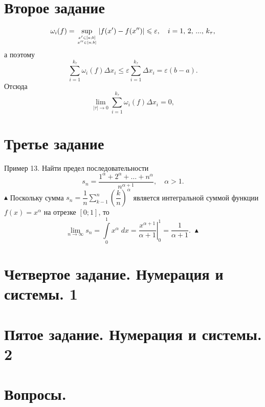 \documentclass[a4paper,12pt]{article} %
\begin{document}
	\section{Второе задание}
	$$
		\omega_i(f) = \sup \limits_{x' \in \left[a ; b\right] \atop x'' \in \left[a ; b\right]} |f(x') -f(x'')| \leqslant \varepsilon, \quad
		i=1,\, 2, \, ... , \, k_\tau,
	$$
	а поэтому
	$$
		\sum \limits_{i=1}^{k_\tau} \omega_i(f) \Delta x_i \leqslant \varepsilon 
		\sum \limits_{i=1}^{k_\tau} \Delta x_i = 
		\varepsilon \left(b - a\right).
	$$
	Отсюда
	$$
		\lim \limits_{| \tau | \to 0} \sum \limits_{i=1}^{k_\tau} \omega_i(f) \Delta x_i = 0,
	$$
	
	\section{Третье задание}
	Пример 13. Найти предел последовательности 
	$$
		s_n = \dfrac{1^{\alpha} + 2^{\alpha} + \dots + n^{\alpha}}{n^{\alpha + 1}}, \quad \alpha > 1.
	$$
	$\blacktriangle$ Поскольку сумма $s_n \! = \dfrac{1}{n} \displaystyle \sum \limits_{k-1}^n \left( \dfrac{k}{n} \right)^ \alpha$ является интегральной суммой функции
	$f(x) = x^{\alpha}$ на отрезке $\left[0; 1\right]$, то
	$$
		\lim \limits_{n \to \infty} s_n = 
		\int \limits_0^1 x^{\alpha} \; dx = 
		\left. \dfrac{x^{\alpha + 1}}{\alpha + 1} \right|_0^1 =
		\dfrac{1}{\alpha + 1}. \; \blacktriangle
	$$
	
	\newpage
	\section{Четвертое задание. Нумерация и системы. 1}
	
	
	\newpage
	\section{Пятое задание. Нумерация и системы. 2}
	
	
	\newpage
	\section{Вопросы.}
\end{document}
